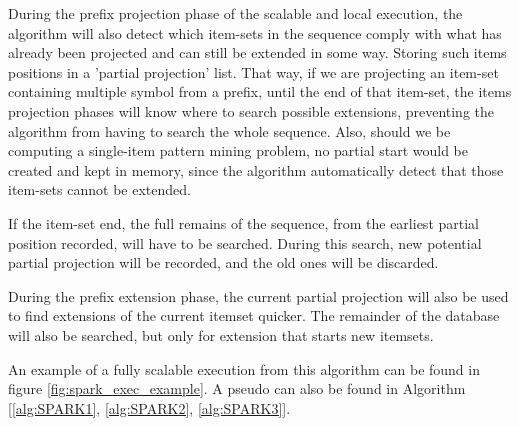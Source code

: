 \documentclass{eplmastersthesis}
\begin{document}
During the prefix projection phase of the scalable and local execution, the algorithm will also detect which item-sets in the sequence comply with what has already been projected and can still be extended in some way. Storing such items positions in a 'partial projection' list. \newline
That way, if we are projecting an item-set containing multiple symbol from a prefix, until the end of that item-set, the items projection phases will know where to search possible extensions, preventing the algorithm from having to search the whole sequence. \newline
Also, should we be computing a single-item pattern mining problem, no partial start would be created and kept in memory, since the algorithm automatically detect that those item-sets cannot be extended. \newline

If the item-set end, the full remains of the sequence, from the earliest partial position recorded, will have to be searched. During this search, new potential partial projection will be recorded, and the old ones will be discarded. \newline

During the prefix extension phase, the current partial projection will also be used to find extensions of the current itemset quicker. The remainder of the database will also be searched, but only for extension that starts new itemsets. \newline

An example of a fully scalable execution from this algorithm can be found in figure \ref{fig:spark_exec_example}. A pseudo can also be found in Algorithm [\ref{alg:SPARK1}, \ref{alg:SPARK2}, \ref{alg:SPARK3}]. \newline
\end{document}
